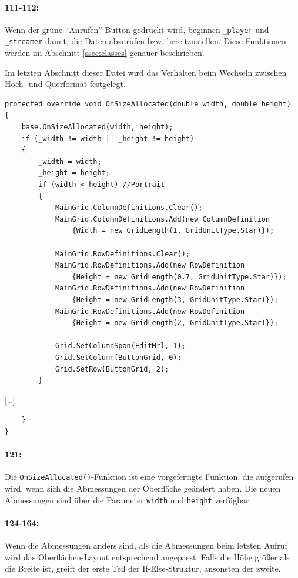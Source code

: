 \paragraph{111-112:} Wenn der grüne \enquote{Anrufen}-Button gedrückt wird, beginnen \texttt{\_player} und \texttt{\_streamer} damit, die Daten abzurufen bzw. bereitzustellen. Diese Funktionen werden im Abschnitt \ref{ssec:classes} genauer beschrieben.

Im letzten Abschnitt dieser Datei wird das Verhalten beim Wechseln zwischen Hoch- und Querformat festgelegt.
\begin{verbatim}
protected override void OnSizeAllocated(double width, double height)
{
    base.OnSizeAllocated(width, height);
    if (_width != width || _height != height)
    {
        _width = width;
        _height = height;
        if (width < height) //Portrait
        {
            MainGrid.ColumnDefinitions.Clear();
            MainGrid.ColumnDefinitions.Add(new ColumnDefinition
                {Width = new GridLength(1, GridUnitType.Star)});

            MainGrid.RowDefinitions.Clear();
            MainGrid.RowDefinitions.Add(new RowDefinition
                {Height = new GridLength(0.7, GridUnitType.Star)});
            MainGrid.RowDefinitions.Add(new RowDefinition
                {Height = new GridLength(3, GridUnitType.Star)});
            MainGrid.RowDefinitions.Add(new RowDefinition
                {Height = new GridLength(2, GridUnitType.Star)});

            Grid.SetColumnSpan(EditMrl, 1);
            Grid.SetColumn(ButtonGrid, 0);
            Grid.SetRow(ButtonGrid, 2);
        }
\end{verbatim}
[\dots]
\begin{verbatim}
    }
}
\end{verbatim}
\paragraph{121:} Die \texttt{OnSizeAllocated()}-Funktion ist eine vorgefertigte Funktion, die aufgerufen wird, wenn sich die Abmessungen der Oberfläche geändert haben.
Die neuen Abmessungen sind über die Parameter \texttt{width} und \texttt{height} verfügbar.
\paragraph{124-164:} Wenn die Abmessungen anders sind, als die Abmessungen beim letzten Aufruf wird das Oberflächen-Layout entsprechend angepasst.
Falls die Höhe größer als die Breite ist, greift der erste Teil der If-Else-Struktur, ansonsten der zweite.
